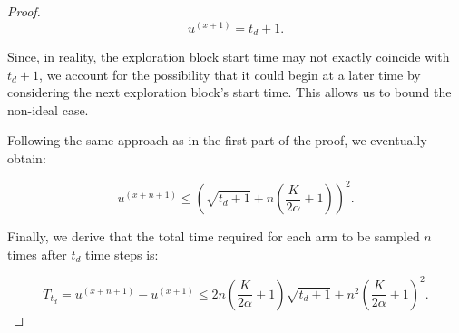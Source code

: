 \documentclass[10pt,a4paper]{amsart}
\begin{document}
\begin{proof}
    \begin{equation}
    u^{(x+1)} = t_d + 1.
    \end{equation}
    
    Since, in reality, the exploration block start time may not exactly coincide with \(t_d + 1\), we account for the possibility that it could begin at a later time by considering the next exploration block's start time. This allows us to bound the non-ideal case.
    
    Following the same approach as in the first part of the proof, we eventually obtain:
    
    \begin{equation}
    u^{(x+n+1)} \leq \left( \sqrt{t_d + 1} + n\left(\frac{K}{2\alpha} + 1\right) \right)^2.
    \end{equation}
    
    Finally, we derive that the total time required for each arm to be sampled \(n\) times after \(t_d\) time steps is:
    
    \begin{equation}
    T_{t_d} = u^{(x+n+1)} - u^{(x+1)} \leq 2n\left( \frac{K}{2\alpha} + 1 \right) \sqrt{t_d + 1} + n^2 \left( \frac{K}{2\alpha} + 1 \right)^2.
    \end{equation}


\end{proof}
\end{document}
